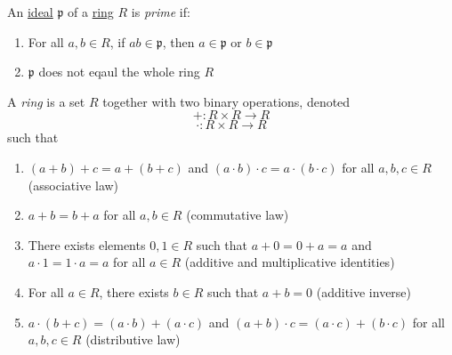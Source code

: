 \begin{definition} \label{primeideal}%
  An \hyperref[ideal]{ideal} $\mathfrak{p}$ of a \hyperref[ring]{ring} $R$ is \emph{prime} if:
  \begin{enumerate}
    \item For all $a,b \in R$, if $ab \in \mathfrak{p}$, then $a \in \mathfrak{p}$ or $b \in \mathfrak{p}$
    \item $\mathfrak{p}$ does not eqaul the whole ring $R$
  \end{enumerate}
\end{definition}

\begin{definition} \label{ring} %
  A \emph{ring} is a set $R$ together with two binary operations, denoted 
  $$+: R \times R \longrightarrow R$$
  $$ \cdot: R \times R \longrightarrow R$$ such that
  \begin{enumerate}
    \item $(a+b)+c = a+(b+c)$ and $(a \cdot b) \cdot c = a \cdot (b \cdot c)$ for all $a,b,c \in R$ (associative law)
    \item $a+b = b+a$ for all $a,b \in R$ (commutative law)
    \item There exists elements $0,1 \in R$ such that $a+0 = 0 + a = a $ and $a\cdot1 = 1 \cdot a = a $ for all $a \in R$ (additive and multiplicative identities)
    \item For all $a \in R$, there exists $b \in R$ such that $a+b = 0$ (additive inverse)
    \item $a\cdot(b+c) = (a \cdot b) + (a \cdot c)$ and $(a+b) \cdot c = (a \cdot c) + (b \cdot c)$ for all $a,b,c \in R$ (distributive law)
  \end{enumerate}
\end{definition}